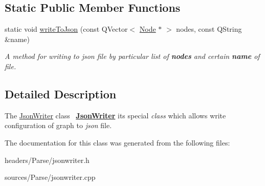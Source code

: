 \subsection*{Static Public Member Functions}
\begin{DoxyCompactItemize}
\item 
\mbox{\label{class_json_writer_a7845614c8c208f9ab826c97603ab274c}} 
static void \mbox{\hyperlink{class_json_writer_a7845614c8c208f9ab826c97603ab274c}{write\+To\+Json}} (const Q\+Vector$<$ \mbox{\hyperlink{class_node}{Node}} $\ast$ $>$ nodes, const Q\+String \&name)
\begin{DoxyCompactList}\small\item\em A {\itshape method} for writing to {\itshape json} {\itshape file} by particular list of {\bfseries{nodes}} and certain {\bfseries{name}} of {\itshape file}. \end{DoxyCompactList}\end{DoxyCompactItemize}


\subsection{Detailed Description}
The \mbox{\hyperlink{class_json_writer}{Json\+Writer}} class~\newline
{\bfseries{\mbox{\hyperlink{class_json_writer}{Json\+Writer}}}} it\textquotesingle{}s special {\itshape class} which allows write configuration of graph to {\itshape json} file. 

The documentation for this class was generated from the following files\+:\begin{DoxyCompactItemize}
\item 
headers/\+Parse/jsonwriter.\+h\item 
sources/\+Parse/jsonwriter.\+cpp\end{DoxyCompactItemize}

